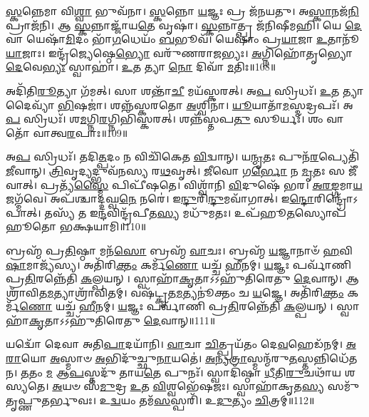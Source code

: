 \-\ul{𑌸𑍍𑌕}\-𑌨𑍍𑌨𑍇𑌮𑌾 𑌵𑌿\-\ul{𑌶𑍍𑌵𑌾} 𑌭𑍁𑌵᳴𑌨𑌾।
\-\ul{𑌸𑍍𑌕}\-𑌨𑍍𑌨𑍋 \ul{𑌯}\-𑌜𑍍𑌞𑌃 𑌪𑍍𑌰 𑌜᳴𑌨𑌯𑌤𑍁।
𑌅\-\ul{𑌸𑍍𑌕𑌾}\-𑌨𑌜᳴\-\ul{𑌨𑌿} 𑌪𑍍𑌰𑌾𑌜᳴𑌨𑌿।
𑌆 \ul{𑌸𑍍𑌕}\-𑌨𑍍𑌨𑌾𑌜𑍍𑌜𑌾᳴𑌯\-\ul{𑌤𑍇} 𑌵𑍃𑌷𑌾॑।
\-\ul{𑌸𑍍𑌕}\-𑌨𑍍𑌨𑌾𑌤𑍍𑌪𑍍𑌰 𑌜᳴𑌨𑌿𑌷𑍀𑌮𑌹𑌿।
𑌯𑍇 \ul{𑌦𑍇}\-𑌵𑌾 𑌯𑍇𑌷𑌾᳴\-\ul{𑌮𑌿}\-𑌦𑌂 𑌭𑌾᳴\-\ul{𑌗}\-𑌧𑍇𑌯𑌂᳴ \ul{𑌬}\-𑌭𑍂𑌵᳴।
𑌯𑍇𑌷𑌾𑌂॑ 𑌪𑍍𑌰\-\ul{𑌯𑌾}\-𑌜𑌾 \ul{𑌉}\-𑌤𑌾𑌨𑍂᳴\-\ul{𑌯𑌾}\-𑌜𑌾𑌃।
𑌇𑌨𑍍𑌦𑍍𑌰᳴𑌜𑍍𑌯𑍇𑌷𑍍𑌠𑍇\-\ul{𑌭𑍍𑌯𑍋} 𑌵𑌰𑍁᳴𑌣𑌰𑌾𑌜𑌭𑍍𑌯𑌃।
\-\ul{𑌅}\-𑌗𑍍𑌨𑌿𑌹𑍋᳴𑌤𑍃𑌭𑍍𑌯𑍋 \ul{𑌦𑍇}\-𑌵𑍇\-\ul{𑌭𑍍𑌯𑌃} 𑌸𑍍𑌵𑌾𑌹𑌾॑।
\-\ul{𑌉}\-𑌤 𑌤𑍍𑌯𑌾 \ul{𑌨𑍋} 𑌦𑌿𑌵𑌾᳴ \ul{𑌮}\-𑌤𑌿𑌃॥108॥

𑌅𑌦𑌿᳴𑌤𑌿\-\ul{𑌰𑍂}\-𑌤𑍍𑌯𑌾 𑌗᳴𑌮𑌤𑍍।
𑌸𑌾 𑌶𑌨𑍍𑌤𑌾᳴\-\ul{𑌚𑍀} 𑌮𑌯᳴𑌸𑍍𑌕𑌰𑌤𑍍।
𑌅\-\ul{𑌪} 𑌸𑍍𑌰𑌿𑌧𑌃᳴।
\-\ul{𑌉}\-𑌤 𑌤𑍍𑌯𑌾 𑌦𑍈𑌵𑍍𑌯𑌾᳴ \ul{𑌭𑌿}\-𑌷𑌜𑌾॑।
𑌶𑌨𑍍𑌨᳴𑌸𑍍𑌕𑌰𑌤𑍋 \ul{𑌅}\-𑌶𑍍𑌵𑌿𑌨𑌾॑।
\-\ul{𑌯𑍂}\-𑌯𑌾𑌤𑌾᳴\-\ul{𑌮}\-𑌸𑍍𑌮𑌦𑍍𑌰𑌪𑌃᳴।
𑌅\-\ul{𑌪} 𑌸𑍍𑌰𑌿𑌧𑌃᳴।
𑌶\-\ul{𑌮}\-𑌗𑍍𑌨𑌿\-\ul{𑌰}\-𑌗𑍍𑌨𑌿𑌭𑌿᳴𑌸𑍍𑌕𑌰𑌤𑍍।
𑌶𑌨𑍍𑌨᳴𑌸𑍍𑌤𑌪\-\ul{𑌤𑍁} 𑌸𑍂𑌰𑍍𑌯𑌃᳴।
𑌶𑌂 𑌵𑌾𑌤𑍋᳴ 𑌵𑌾𑌤𑍍𑌵\-\ul{𑌰}\-𑌪𑌾𑌃॥109॥

𑌅\-\ul{𑌪} 𑌸𑍍𑌰𑌿𑌧𑌃᳴।
𑌤𑌦𑌿\-\ul{𑌤𑍍𑌪}\-𑌦𑌂 𑌨 𑌵𑌿𑌚𑌿᳴𑌕𑍇𑌤 \ul{𑌵𑌿}\-𑌦𑍍𑌵𑌾𑌨𑍍।
𑌯\-\ul{𑌨𑍍𑌮𑍃}\-𑌤𑌃 𑌪𑍁𑌨᳴\-\ul{𑌰}\-𑌪𑍍𑌯𑍇𑌤𑌿᳴ \ul{𑌜𑍀}\-𑌵𑌾𑌨𑍍।
\-\ul{𑌤𑍍𑌰𑌿}\-𑌵𑍃𑌦𑍍𑌯𑌦𑍍𑌭𑍁𑌵᳴𑌨𑌸𑍍𑌯 𑌰\-\ul{𑌥}\-𑌵𑍃𑌤𑍍।
\-\ul{𑌜𑍀}\-𑌵𑍋 𑌗\-\ul{𑌰𑍍𑌭𑍋} 𑌨 \ul{𑌮𑍃}\-𑌤𑌃 𑌸 𑌜𑍀᳴𑌵𑌾𑌤𑍍।
𑌪𑍍𑌰𑌤𑍍𑌯᳴\-\ul{𑌸𑍍𑌮𑍈} 𑌪𑌿𑌪𑍀᳴𑌷𑌤𑍇।
𑌵𑌿𑌶𑍍𑌵𑌾᳴𑌨𑌿 \ul{𑌵𑌿}\-𑌦𑍁𑌷𑍇᳴ 𑌭𑌰।
\-\ul{𑌅}\-\-\ul{𑌰}\-\-\ul{𑌙𑍍𑌗}\-𑌮𑌾\-\ul{𑌯} 𑌜𑌗𑍍𑌮᳴𑌵𑍇।
𑌅𑌪᳴𑌶𑍍𑌚𑌾𑌦𑍍𑌦𑌘𑍍𑌵\-\ul{𑌨𑍇} 𑌨𑌰𑍇॑।
𑌇\-\ul{𑌨𑍍𑌦𑍁}\-𑌰𑌿\-\ul{𑌨𑍍𑌦𑍁}\-𑌮𑌵𑌾᳴𑌗𑌾𑌤𑍍।
𑌇\-\ul{𑌨𑍍𑌦𑍋}\-𑌰𑌿𑌨𑍍𑌦𑍍𑌰𑍋᳴\-𑌽𑌪𑌾𑌤𑍍।
𑌤𑌸𑍍𑌯᳴ 𑌤 𑌇\-\ul{𑌨𑍍𑌦}\-𑌵𑌿𑌨𑍍𑌦𑍍𑌰᳴𑌪𑍀𑌤\-\ul{𑌸𑍍𑌯} 𑌮𑌧𑍁᳴𑌮𑌤𑌃।
𑌉𑌪᳴𑌹𑍂\-\ul{𑌤}\-𑌸𑍍𑌯𑍋𑌪᳴𑌹𑍂𑌤𑍋 𑌭𑌕𑍍𑌷𑌯𑌾𑌮𑌿॥110॥\anuvakamend[\-\ul{𑌉}\-\-\ul{𑌦}\-\-\ul{𑌰𑍍}\-𑌷 𑌇᳴\-\ul{𑌨𑍍𑌦𑍍𑌰𑌿}\-𑌯𑍇\-\ul{𑌣} 𑌗𑌾 \ul{𑌮}\-𑌤𑌿𑌰᳴\-\ul{𑌰}\-𑌪𑌾 𑌅᳴\-\ul{𑌗𑌾}\-𑌤𑍍𑌰𑍀𑌣𑌿᳴ 𑌚]

𑌬𑍍𑌰𑌹𑍍𑌮᳴ 𑌪𑍍𑌰\-\ul{𑌤𑌿}\-𑌷𑍍𑌠𑌾 𑌮𑌨᳴\-\ul{𑌸𑍋} 𑌬𑍍𑌰𑌹𑍍𑌮᳴ \ul{𑌵𑌾}\-𑌚𑌃।
𑌬𑍍𑌰𑌹𑍍𑌮᳴ \ul{𑌯}\-𑌜𑍍𑌞𑌾𑌨𑌾𑍞᳴ \ul{𑌹}\-𑌵𑌿\-\ul{𑌷𑌾}\-𑌮𑌾𑌜𑍍𑌯᳴𑌸𑍍𑌯।
𑌅𑌤𑌿᳴𑌰𑌿\-\ul{𑌕𑍍𑌤𑌂} 𑌕𑌰𑍍𑌮᳴\-\ul{𑌣𑍋} 𑌯𑌚𑍍𑌚᳴ \ul{𑌹𑍀}\-𑌨𑌮𑍍।
\-\ul{𑌯}\-𑌜𑍍𑌞𑌃 𑌪𑌰𑍍𑌵𑌾᳴𑌣𑌿 𑌪𑍍𑌰\-\ul{𑌤𑌿}\-𑌰𑌨𑍍𑌨𑍇᳴𑌤𑌿 \ul{𑌕}\-𑌲𑍍𑌪𑌯𑌨𑍍।
𑌸𑍍𑌵𑌾𑌹𑌾᳴\-\ul{𑌕𑍃}\-𑌤𑌾\-𑌽𑌽𑌹𑍁᳴𑌤𑌿𑌰𑍇𑌤𑍁 \ul{𑌦𑍇}\-𑌵𑌾𑌨𑍍।
𑌆𑌶𑍍𑌰𑌾᳴𑌵𑌿𑌤\-\ul{𑌮}\-𑌤𑍍𑌯𑌾𑌶𑍍𑌰𑌾᳴𑌵𑌿𑌤𑌮𑍍।
𑌵𑌷᳴𑌟𑍍𑌕𑍃𑌤\-\ul{𑌮}\-𑌤𑍍𑌯𑌨𑍂॑𑌕𑍍𑌤𑌂 𑌚 \ul{𑌯}\-𑌜𑍍𑌞𑍇।
𑌅𑌤𑌿᳴𑌰𑌿\-\ul{𑌕𑍍𑌤𑌂} 𑌕𑌰𑍍𑌮᳴\-\ul{𑌣𑍋} 𑌯𑌚𑍍𑌚᳴ \ul{𑌹𑍀}\-𑌨𑌮𑍍।
\-\ul{𑌯}\-𑌜𑍍𑌞𑌃 𑌪𑌰𑍍𑌵𑌾᳴𑌣𑌿 𑌪𑍍𑌰\-\ul{𑌤𑌿}\-𑌰𑌨𑍍𑌨𑍇᳴𑌤𑌿 \ul{𑌕}\-𑌲𑍍𑌪𑌯𑌨𑍍।
𑌸𑍍𑌵𑌾𑌹𑌾᳴\-\ul{𑌕𑍃}\-𑌤𑌾\-𑌽𑌽𑌹𑍁᳴𑌤𑌿𑌰𑍇𑌤𑍁 \ul{𑌦𑍇}\-𑌵𑌾𑌨𑍍॥111॥

𑌯𑌦𑍍𑌵𑍋᳴ 𑌦𑍇𑌵𑌾 𑌅𑌤𑌿\-\ul{𑌪𑌾}\-𑌦𑌯𑌾᳴𑌨𑌿।
\-\ul{𑌵𑌾}\-𑌚𑌾 \ul{𑌚𑌿}\-𑌤𑍍𑌪𑍍𑌰𑌯᳴𑌤𑌂 𑌦𑍇\-\ul{𑌵}\-𑌹𑍇𑌡᳴𑌨𑌮𑍍।
\-\ul{𑌅}\-\-\ul{𑌰𑌾}\-𑌯𑍋 \ul{𑌅}\-𑌸𑍍𑌮𑌾𑍞 \ul{𑌅}\-𑌭𑌿𑌦𑍁᳴𑌚𑍍𑌛𑍁\-\ul{𑌨𑌾}\-𑌯𑌤𑍇॑।
\-\ul{𑌅}\-𑌨𑍍𑌯\-\ul{𑌤𑍍𑌰𑌾}\-𑌸𑍍𑌮𑌨𑍍𑌮᳴𑌰𑍁\-\ul{𑌤}\-𑌸𑍍𑌤𑌨𑍍𑌨𑌿𑌧𑍇᳴\-𑌤𑌨।
\-\ul{𑌤}\-𑌤𑌂 \ul{𑌮} 𑌆\-\ul{𑌪}\-𑌸𑍍𑌤𑌦𑍁᳴ 𑌤𑌾𑌯\-\ul{𑌤𑍇} 𑌪𑍁𑌨𑌃᳴।
𑌸𑍍𑌵𑌾𑌦𑌿᳴𑌷𑍍𑌠𑌾 \ul{𑌧𑍀}\-𑌤𑌿\-\ul{𑌰𑍁}\-𑌚𑌥𑌾᳴𑌯 𑌶𑌸𑍍𑌯𑌤𑍇।
\-\ul{𑌅}\-𑌯𑍞 𑌸᳴\-\ul{𑌮𑍁}\-𑌦𑍍𑌰 \ul{𑌉}\-𑌤 \ul{𑌵𑌿}\-𑌶𑍍𑌵𑌭𑍇᳴𑌷𑌜𑌃।
𑌸𑍍𑌵𑌾𑌹𑌾᳴𑌕𑍃𑌤\-\ul{𑌸𑍍𑌯} 𑌸𑌮𑍁᳴𑌤𑍃𑌪𑍍𑌣𑍁𑌤𑌰𑍍𑌭𑍁𑌵𑌃।
𑌉\-\ul{𑌦𑍍𑌵}\-𑌯𑌂 𑌤𑌮᳴\-\ul{𑌸}\-𑌸𑍍𑌪𑌰𑌿᳴।
𑌉\-\ul{𑌦𑍁}\-𑌤𑍍𑌯𑌂 \ul{𑌚𑌿}\-𑌤𑍍𑌰𑌮𑍍॥112॥

